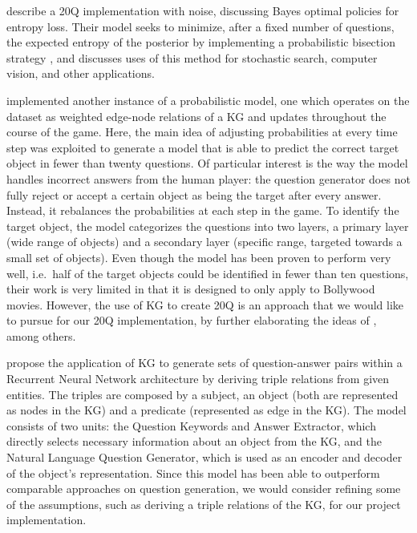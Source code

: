 \documentclass[a4paper,12pt]{article}
\begin{document}
\citet{JedynakEa2012} describe a 20Q implementation with noise, discussing Bayes optimal policies for entropy loss. 
Their model seeks to minimize, after a fixed number of questions, the expected entropy of the posterior by implementing a probabilistic bisection strategy \citep{Horstein1963, WaeberEa2011}, and discusses uses of this method for stochastic search, computer vision, and other applications. 

\citet{DeyEa2019} implemented another instance of a probabilistic model, one which operates on the dataset as weighted edge-node relations of a KG and updates throughout the course of the game. 
Here, the main idea of adjusting probabilities at every time step was exploited to generate a model that is able to predict the correct target object in fewer than twenty questions. 
Of particular interest is the way the model handles incorrect answers from the human player: the question generator does not fully reject or accept a certain object as being the target after every answer. 
Instead, it rebalances the probabilities at each step in the game. 
To identify the target object, the model categorizes the questions into two layers, a primary layer (wide range of objects) and a secondary layer (specific range, targeted towards a small set of objects). Even though the model has been proven to perform very well, i.e.\ half of the target objects could be identified in fewer than ten questions, their work is very limited in that it is designed to only apply to Bollywood movies. 
However, the use of KG to create 20Q is an approach that we would like to pursue for our 20Q implementation, by further elaborating the ideas of \citet{DeyEa2019}, among others.

\citet{ReddyEa2017} propose the application of KG to generate sets of question-answer pairs within a Recurrent Neural Network architecture by deriving triple relations from given entities. 
The triples are composed by a subject, an object (both are represented as nodes in the KG) and a predicate (represented as edge in the KG). 
The model consists of two units: the Question Keywords and Answer Extractor, which directly selects necessary information about an object from the KG, and the Natural Language Question Generator, which is used as an encoder and decoder of the object’s representation. 
Since this model has been able to outperform comparable approaches on question generation, we would consider refining some of the assumptions, such as deriving a triple relations of the KG, for our project implementation. 
\end{document}
